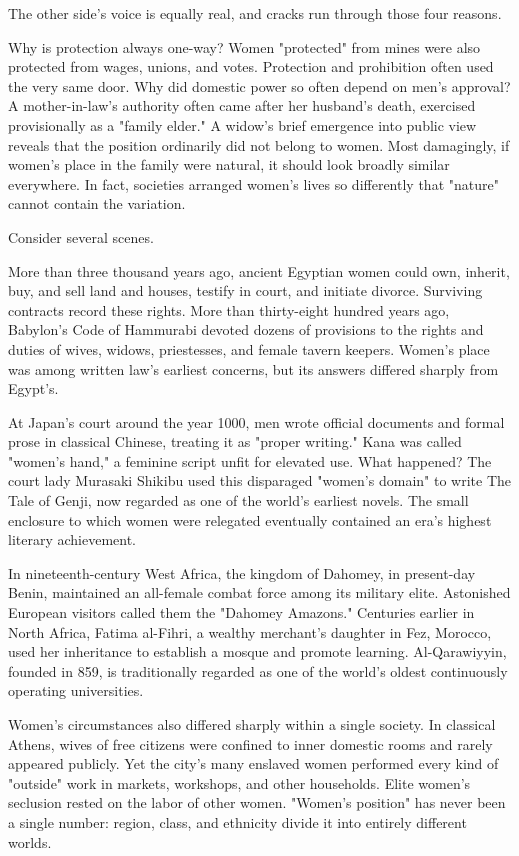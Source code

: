 The other side's voice is equally real, and cracks run through those four reasons.

Why is protection always one-way? Women "protected" from mines were also protected from wages, unions, and votes. Protection and prohibition often used the very same door. Why did domestic power so often depend on men's approval? A mother-in-law's authority often came after her husband's death, exercised provisionally as a "family elder." A widow's brief emergence into public view reveals that the position ordinarily did not belong to women. Most damagingly, if women's place in the family were natural, it should look broadly similar everywhere. In fact, societies arranged women's lives so differently that "nature" cannot contain the variation.

Consider several scenes.

More than three thousand years ago, ancient Egyptian women could own, inherit, buy, and sell land and houses, testify in court, and initiate divorce. Surviving contracts record these rights. More than thirty-eight hundred years ago, Babylon's Code of Hammurabi devoted dozens of provisions to the rights and duties of wives, widows, priestesses, and female tavern keepers. Women's place was among written law's earliest concerns, but its answers differed sharply from Egypt's.

At Japan's court around the year 1000, men wrote official documents and formal prose in classical Chinese, treating it as "proper writing." Kana was called "women's hand," a feminine script unfit for elevated use. What happened? The court lady Murasaki Shikibu used this disparaged "women's domain" to write The Tale of Genji, now regarded as one of the world's earliest novels. The small enclosure to which women were relegated eventually contained an era's highest literary achievement.

In nineteenth-century West Africa, the kingdom of Dahomey, in present-day Benin, maintained an all-female combat force among its military elite. Astonished European visitors called them the "Dahomey Amazons." Centuries earlier in North Africa, Fatima al-Fihri, a wealthy merchant's daughter in Fez, Morocco, used her inheritance to establish a mosque and promote learning. Al-Qarawiyyin, founded in 859, is traditionally regarded as one of the world's oldest continuously operating universities.

Women's circumstances also differed sharply within a single society. In classical Athens, wives of free citizens were confined to inner domestic rooms and rarely appeared publicly. Yet the city's many enslaved women performed every kind of "outside" work in markets, workshops, and other households. Elite women's seclusion rested on the labor of other women. "Women's position" has never been a single number: region, class, and ethnicity divide it into entirely different worlds.

